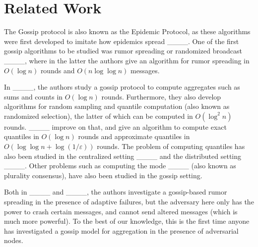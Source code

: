 \section{Related Work}
\label{sec:rel_work}

The Gossip protocol is also known as the Epidemic Protocol, as these algorithms were first developed to imitate how epidemics spread ____. One of the first gossip algorithms to be studied was rumor spreading or randomized broadcast ____, where in the latter the authors give an algorithm for rumor spreading in $O(\log n)$ rounds and $O(n \log \log n)$ messages. 

In ____, the authors study a gossip protocol to compute aggregates such as sums and counts in $O(\log n)$ rounds. Furthermore, they also develop algorithms for random sampling and quantile computation (also known as randomized selection), the latter of which can be computed in $O(\log^2 n)$ rounds. ____ improve on that, and give an algorithm to compute exact quantiles in $O(\log n)$ rounds and approximate quantiles in $O(\log \log n + \log (1 / \varepsilon))$ rounds. The problem of computing quantiles has also been studied in the centralized setting ____ and the distributed setting ____. Other problems such as computing the mode ____ (also known as plurality consensus), have also been studied in the gossip setting. 

Both in ____ and ____, the authors investigate a gossip-based rumor spreading in the presence of adaptive failures, but the adversary here only has the power to crash certain messages, and cannot send altered messages (which is much more powerful). To the best of our knowledge, this is the first time anyone has investigated a gossip model for aggregation in the presence of adversarial nodes.